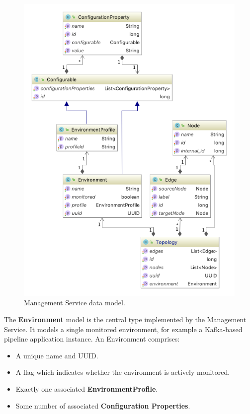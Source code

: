  \begin{figure}[H]
	\centering  
	\includegraphics[height=0.6\textheight]{figures/impl/mgmt/domain_package.png}
	\caption{Management Service data model.}
	\label{mgmt_svc_domain_model}
\end{figure}


The \textbf{Environment} model is the central type implemented by the Management Service. It models a single monitored environment, for example a Kafka-based pipeline application instance. An Environment comprises:
\begin{itemize}
	\item A unique name and UUID.
	\item A flag which indicates whether the environment is actively monitored.
	\item Exactly one associated \textbf{EnvironmentProfile}.
	\item Some number of associated \textbf{Configuration Properties}.
\end{itemize}

